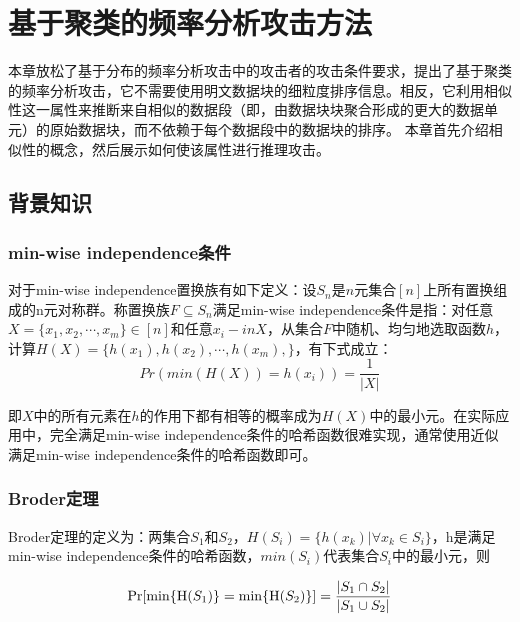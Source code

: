 \chapter{基于聚类的频率分析攻击方法}
\label{sec:ClusteringAttack}

本章放松了基于分布的频率分析攻击中的攻击者的攻击条件要求，提出了基于聚类的频率分析攻击，它不需要使用明文数据块的细粒度排序信息。相反，它利用相似性这一属性来推断来自相似的数据段（即，由数据块块聚合形成的更大的数据单元）的原始数据块，而不依赖于每个数据段中的数据块的排序。 本章首先介绍相似性的概念，然后展示如何使该属性进行推理攻击。

\section{背景知识}
\label{sec:similarity}

\subsection{min-wise independence条件}

对于min-wise independence置换族有如下定义：设$S_n$是$n$元集合$[n]$上所有置换组成的n元对称群。称置换族$F \subseteq S_n$满足min-wise independence条件是指：对任意$X=\{x_1,x_2,\cdots,x_m\}\in[n]$和任意$x_i-inX$，从集合$F$中随机、均匀地选取函数$h$，计算$H(X)=\{h(x_1),h(x_2),\cdots,h(x_m),\}$，有下式成立：
\begin{equation}
    \label{eq:min-wise independence}
    Pr(min(H(X)) = h(x_i) ) = \frac{1}{|X|}
\end{equation}

即$X$中的所有元素在$h$的作用下都有相等的概率成为$H(X)$中的最小元。在实际应用中，完全满足min-wise independence条件的哈希函数很难实现，通常使用近似满足min-wise independence条件的哈希函数即可。

\subsection{Broder定理}
Broder定理的定义为：两集合$S_1$和$S_2$，$H(S_i)=\{h(x_k)|\forall x_k \in S_i \}$，h是满足min-wise independence条件的哈希函数，$min(S_i)$代表集合$S_i$中的最小元，则

\begin{equation}
    \label{eq:broder}
    \Pr[\min\{{\rm H}(S_1)\} = \min\{{\rm H}(S_2)\} ] = \frac{|S_1 \cap S_2|}{|S_1 \cup S_2|}
\end{equation}


